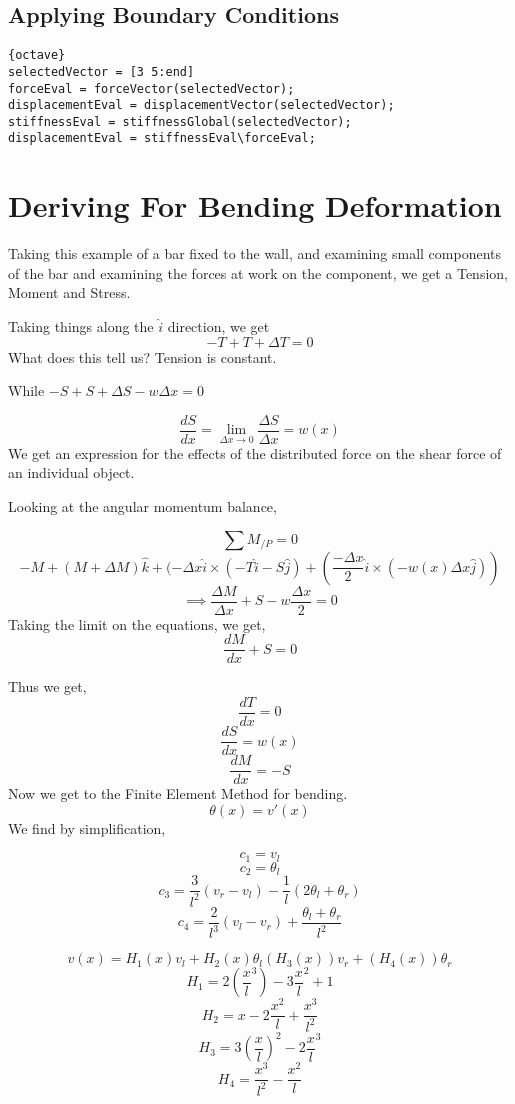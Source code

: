 \documentclass{report}
\begin{document}
\subsection{Applying Boundary Conditions}
\begin{lstlisting}{octave}
selectedVector = [3 5:end]
forceEval = forceVector(selectedVector);
displacementEval = displacementVector(selectedVector);
stiffnessEval = stiffnessGlobal(selectedVector);
displacementEval = stiffnessEval\forceEval;
\end{lstlisting}
\section{Deriving For Bending Deformation}
Taking this example of a bar fixed to the wall, and examining small components of the bar and examining the forces at work on the component, we get a Tension, Moment and Stress.

Taking things along the $\hat{i}$ direction, we get
$$
-T + T + \Delta T = 0
$$
 What does this tell us? Tension is constant. 

While $-S + S + \Delta S - w\Delta x = 0$

$$
\frac{dS}{dx} = \lim_{\Delta x \rightarrow 0} \frac{\Delta S}{\Delta x} = w(x)
$$
We get an expression for the effects of the distributed force on the shear force of an individual object.

Looking at the angular momentum balance,

$$
\sum M_{/P} = 0
$$
$$
-M + (M + \Delta M) \hat{k} + (-\Delta x \hat{i} \times(-T\hat{i} - S \hat{j}) + (\frac{-\Delta x}{2} \hat{i} \times (-w(x) \Delta x \hat{j}))
$$
$$
\implies \frac{\Delta M }{\Delta x} + S - w\frac{\Delta x}{2} = 0
$$
Taking the limit on the equations, we get,
$$
\frac{dM}{dx} + S = 0
$$

Thus we get,
$$
\frac{dT}{dx} = 0
$$
$$
\frac{dS}{dx} = w(x)
$$
$$
\frac{dM}{dx} = -S
$$
Now we get to the Finite Element Method for bending.
$$
\theta(x) = v'(x)
$$
We find by simplification,

$$
c_1 = v_l 
$$
$$
c_2 = \theta_l
$$
$$
c_3 = \frac{3}{l^2}(v_r-v_l) - \frac{1}{l} (2\theta_l + \theta_r)
$$
$$
c_4 = \frac{2}{l^3} (v_l-v_r) + \frac{\theta_l+\theta_r}{l^2}
$$

$$
v(x) = H_1(x) v_l + H_2(x)\theta_l (H_3(x)) v_r + (H_4(x)) \theta_r
$$
$$
H_1 = 2(\frac{x}{l}^3) - 3\frac{x}{l}^2 + 1
$$
$$
H_2 = x-2\frac{x^2}{l} + \frac{x^3}{l^2}
$$
$$
H_3 = 3(\frac{x}{l})^2 -2\frac{x}{l}^3
$$
$$
H_4 = \frac{x^3}{l^2} - \frac{x^2}{l}
$$
\end{document}
